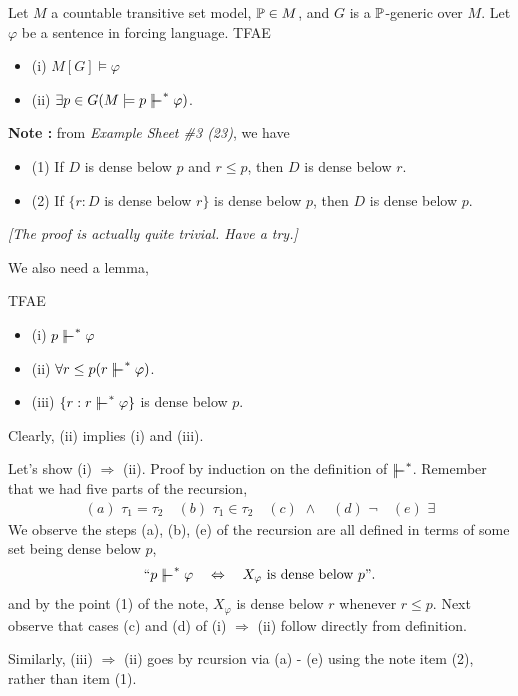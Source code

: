 \documentclass[12pt,a4paper]{article}
\newenvironment{proof}
{\begin{changemargin}{0.5cm}{0.5cm} 
	}%
	{\end{changemargin}
}
\renewenvironment{i}
{\begin{itemize} 
	}%
	{\end{itemize}
}
\newenvironment{p}
{\begin{proof} 
	}%
	{\end{proof}
}
\begin{document}
 Let $M$ a countable transitive set model, $\mathbb{P} \in M$, and $G$ is a $\mathbb{P}$-generic over $M$. Let $\varphi$ be a sentence in forcing language. TFAE
\begin{i}
\item[(i)] $M[G] \models \varphi$
\item[(ii)] $\exists p \in G (M\models p \forces^* \varphi)$.
\end{i}
\s

\textbf{Note :} from \emph{Example Sheet \#3 (23)}, we have
\begin{i}
\item[(1)] If $D$ is dense below $p$ and $r\leq p$, then $D$ is dense below $r$.
\item[(2)] If $\{r : D$ is dense below $r \}$ is dense below $p$, then $D$ is dense below $p$.
\end{i}
\emph{[The proof is actually quite trivial. Have a try.]}
\s

We also need a lemma,
\s

\lem TFAE
\begin{i} 
\item[(i)] $p\forces^* \varphi$
\item[(ii)] $\forall r\leq p (r\forces^* \varphi)$.
\item[(iii)] $\{r: r\forces^* \varphi \}$ is dense below $p$.
\end{i}
\begin{p}
\pf Clearly, (ii) implies (i) and (iii). 
\s

Let's show (i) $\Rightarrow$ (ii). Proof by induction on the definition of $\forces^*$. Remember that we had five parts of the recursion,
\begin{align*}
(a) \,\, \tau_1 = \tau_2 \quad (b) \,\, \tau_1 \in \tau_2 \quad (c) \,\, \wedge \quad (d) \,\, \neg \quad (e) \,\, \exists
\end{align*}
We observe  the steps (a), (b), (e) of the recursion are all defined in terms of some set being dense below $p$,
\begin{align*}
`` p \forces^* \varphi \quad \Leftrightarrow \quad X_{\varphi} \text{ is dense below }p".
\end{align*}
and by the point (1) of the note, $X_{\varphi}$ is dense below $r$ whenever $r\leq p$. Next observe that cases (c) and (d) of (i) $\Rightarrow$ (ii) follow directly from definition. 
\s

Similarly, (iii) $\Rightarrow$ (ii) goes by rcursion via (a) - (e) using the note item (2), rather than item (1).

\eop
\end{p}
\s
\end{document}
